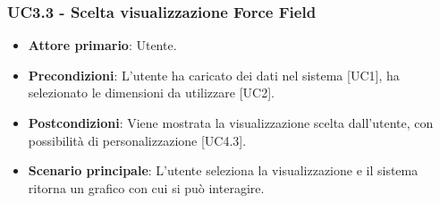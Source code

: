 \subsubsection{UC3.3 - Scelta visualizzazione Force Field}
\begin{itemize}
	\item \textbf{Attore primario}: Utente.
	\item \textbf{Precondizioni}: L'utente ha caricato dei dati nel sistema [UC1], ha selezionato le dimensioni da utilizzare [UC2].
	\item \textbf{Postcondizioni}: Viene mostrata la visualizzazione  scelta dall'utente, con possibilità di personalizzazione [UC4.3].
	\item \textbf{Scenario principale}: L'utente seleziona la visualizzazione  e il sistema ritorna un grafico con cui si può interagire.
\end{itemize}